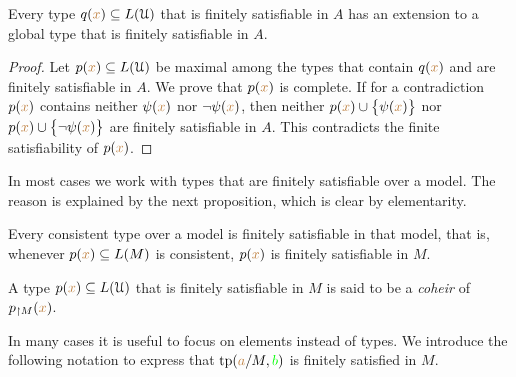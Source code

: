 \begin{proposition}\label{prop_exisntence_coheirs}
Every type $q({\color{brown} x})\subseteq L(\EuScript U)$ that is finitely satisfiable in $A$ has an extension to a global type that is finitely satisfiable in $A$.
\end{proposition}

\begin{proof} 
Let $p({\color{brown} x})\subseteq L(\EuScript U)$ be maximal among the types that contain $q({\color{brown} x})$ and are finitely satisfiable in $A$.
We prove that $p({\color{brown} x})$ is complete.
If for a contradiction $p({\color{brown} x})$ contains neither $\psi({\color{brown} x})$ nor $\neg\psi({\color{brown} x})$, then  neither $p({\color{brown} x})\cup\big\{\psi({\color{brown} x})\big\}$ nor $p({\color{brown} x})\cup\big\{\neg\psi({\color{brown} x})\big\}$ are finitely satisfiable in $A$.
This contradicts the finite satisfiability of $p({\color{brown} x})$.
\end{proof}

In most cases we work with types that are finitely satisfiable over a model.
The reason is explained by the next proposition, which is clear by elementarity.

\begin{proposition}\label{prop_coher_over_model}
    Every consistent type over a model is finitely satisfiable in that model, that is, whenever $p({\color{brown} x})\subseteq L(M)$ is consistent, $p({\color{brown} x})$ is finitely satisfiable in $M$.
\end{proposition}

\begin{definition}\label{def_choeir_uno} A type $p({\color{brown} x}) \subseteq L(\EuScript U)$ that is finitely satisfiable in $M$ is said to be a \emph{coheir\/} of $p_{\restriction M}({\color{brown} x})$.
\end{definition}


In many cases it is useful to focus on elements instead of types.
We introduce the following notation to express that ${\rm tp}({\color{brown} a}/M,{\color{green} b})$ is finitely satisfied in $M$.

